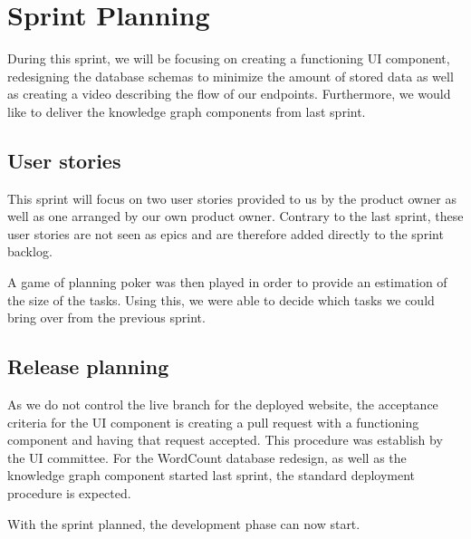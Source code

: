 \section{Sprint Planning}
During this sprint, we will be focusing on creating a functioning UI component, redesigning the database schemas to minimize the amount of stored data as well as creating a video describing the flow of our endpoints. Furthermore, we would like to deliver the knowledge graph components from last sprint. 

\subsection*{User stories}
This sprint will focus on two user stories provided to us by the \knox{} product owner as well as one arranged by our own product owner. 
Contrary to the last sprint, these user stories are not seen as epics and are therefore added directly to the sprint backlog. 


A game of planning poker was then played in order to provide an estimation of the size of the tasks. 
Using this, we were able to decide which tasks we could bring over from the previous sprint.

\subsection*{Release planning}
As we do not control the live branch for the deployed \knox{} website, the acceptance criteria for the UI component is creating a pull request with a functioning component and having that request accepted.
This procedure was establish by the UI committee. 
For the WordCount database redesign, as well as the knowledge graph component started last sprint, the standard deployment procedure is expected. 

With the sprint planned, the development phase can now start.
